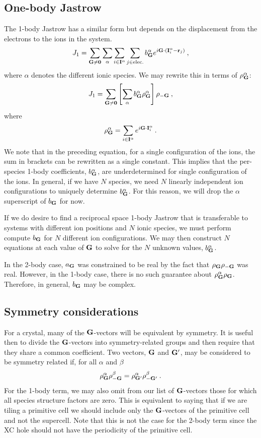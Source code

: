 \subsection{One-body Jastrow}
The 1-body Jastrow has a similar form but depends on the
displacement from the electrons to the ions in the system.
\begin{equation}
J_1 = \sum_{\mathbf{G}\neq\mathbf{0}} \sum_{\alpha}
\sum_{i\in\mathbf{I}^\alpha}\sum_{j\in\text{elec.}} b^{\alpha}_{\mathbf{G}}
  e^{i\mathbf{G}\cdot(\mathbf{I}^{\alpha}_i - \mathbf{r}_j)}\:,
\end{equation}
where $\alpha$ denotes the different ionic species.
We may rewrite this in terms of $\rho^{\alpha}_{\mathbf{G}}$: 
\begin{equation}
J_1 = \sum_{\mathbf{G}\neq\mathbf{0}} \left[\sum_\alpha b^\alpha_{\mathbf{G}}
  \rho_{\mathbf{G}}^\alpha\right] \rho_{-\mathbf{G}}\:,
\end{equation}
where
\begin{equation}
\rho^\alpha_{\mathbf{G}} = \sum_{i\in\mathbf{I}^\alpha} e^{i\mathbf{G}\cdot\mathbf{I}^\alpha_i}\:.
\end{equation}
We note that in the preceding equation, for a single configuration of the
ions, the sum in brackets can be rewritten as a single constant.  This
implies that the per-species 1-body coefficients, $b^\alpha_{\mathbf{G}}$, are
underdetermined for single configuration of the ions.  In general, if
we have $N$ species, we need $N$ linearly independent ion
configurations to uniquely determine $b^{\alpha}_{\mathbf{G}}$.  For this
reason, we will drop the $\alpha$ superscript of $b_{\mathbf{G}}$ for now.  

If we do desire to find a reciprocal space 1-body Jastrow that is
transferable to systems with different ion positions and $N$ 
ionic species, we must perform compute $b_{\mathbf{G}}$ for $N$ different ion
configurations.  We may then construct $N$ equations at each value of
$\mathbf{G}$ to solve for the $N$ unknown values, $b^\alpha_{\mathbf{G}}$.

In the 2-body case, $a_{\mathbf{G}}$ was constrained to be real by the fact
that $\rho_{\mathbf{G}} \rho_{-\mathbf{G}}$ was real.  However, in the 1-body case,
there is no such guarantee about $\rho^\alpha_{\mathbf{G}} \rho_{\mathbf{G}}$.
Therefore, in general, $b_{\mathbf{G}}$ may be complex.

\subsection{Symmetry considerations}
For a crystal, many of the $\mathbf{G}$-vectors will be equivalent by
symmetry.  It is useful then to divide the $\mathbf{G}$-vectors into
symmetry-related groups and then require that they share a common
coefficient.  Two vectors, $\mathbf{G}$ and $\mathbf{G}'$, may be considered to be
symmetry related if, for all $\alpha$ and $\beta$
\begin{equation}
\rho^\alpha_{\mathbf{G}} \rho^\beta_{-\mathbf{G}} = \rho^\alpha_{\mathbf{G}'} \rho^\beta_{-\mathbf{G}'}\:. 
\end{equation}
For the 1-body term, we may also omit from our list of $\mathbf{G}$-vectors
those for which all species structure factors are zero.  This is
equivalent to saying that if we are tiling a primitive cell we
should include only the $\mathbf{G}$-vectors of the primitive cell and not
the supercell.  Note that this is not the case for the 2-body term
since the XC hole should not have the periodicity of
the primitive cell.

